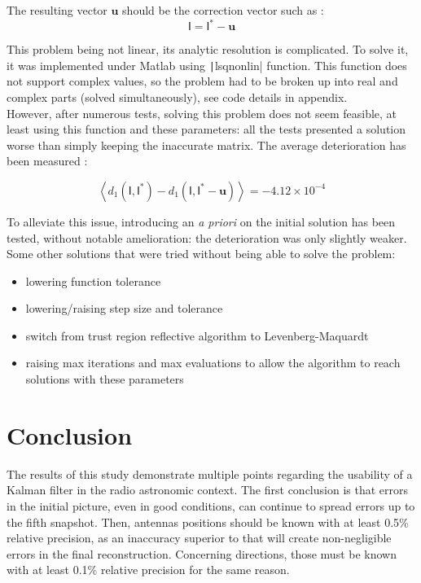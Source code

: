 \documentclass[titlepage,11pt]{article}
\newcommand{\I}{\boldsymbol{\mathsf{I}}}
\renewcommand{\u}{\boldsymbol{u}}
\begin{document}
	The resulting vector $\u$ should be the correction vector such as :
	$$
		\I = \I^*-\u
	$$
	
	This problem being not linear, its analytic resolution is complicated. To solve it, it was implemented under Matlab using \texttt|lsqnonlin| function. This function does not support complex values, so the problem had to be broken up into real and complex parts (solved simultaneously), see code details in appendix.\\
	
	However, after numerous tests, solving this problem does not seem feasible, at least using this function and these parameters: all the tests presented a solution worse than simply keeping the inaccurate matrix. The average deterioration has been measured :
	
	$$
		\left\langle d_1(\I,\I^*) - d_1(\I,\I^*-\u)\right\rangle = -4.12\times 10^{-4}
	$$
	
	To alleviate this issue, introducing an \emph{a priori} on the initial solution has been tested, without notable amelioration: the deterioration was only slightly weaker. \\
	
	Some other solutions that were tried without being able to solve the problem:
	\begin{itemize}
		\item lowering function tolerance
		\item lowering/raising step size and tolerance
		\item switch from trust region reflective algorithm to Levenberg-Maquardt
		\item raising max iterations and max evaluations to allow the algorithm to reach solutions with these parameters
	\end{itemize}
	
	\newpage

	\part{Conclusion}
	
	The results of this study demonstrate multiple points regarding the usability of a Kalman filter in the radio astronomic context. The first conclusion is that errors in the initial picture, even in good conditions, can continue to spread errors up to the fifth snapshot. Then, antennas positions should be known with at least 0.5\% relative precision, as an inaccuracy superior to that will create non-negligible errors in the final reconstruction. Concerning directions, those must be known with at least 0.1\% relative precision for the same reason. \\
	
\end{document}
